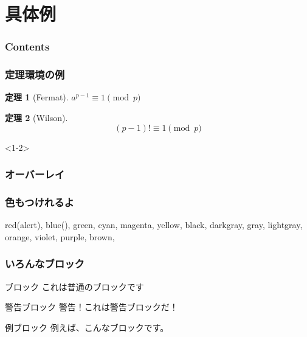 \documentclass[dvipdfmx,11pt,notheorems]{beamer}
\theoremstyle{definition}
\newtheorem{theorem}{定理}
\begin{document}
\section{具体例}
  \begin{frame}\frametitle{Contents}
    \tableofcontents[currentsection] %
  \end{frame}

  \begin{frame}\frametitle{定理環境の例}
  \begin{theorem}[Fermat]
  $a^{p-1} \equiv 1 \pmod{p}$
  \end{theorem}
  \pause
  \begin{theorem}[Wilson]
  \begin{equation}
  (p-1)! \equiv 1 \pmod{p}
  \end{equation}
  \end{theorem}
  \end{frame}

\begin{frame}<1-2>\frametitle{オーバーレイ}
\end{frame}

\begin{frame}\frametitle{色もつけれるよ}
  {\color{red} red}(\alert{alert}),
  {\color{blue} blue}(),
  {\color{green} green},
  {\color{cyan} cyan},
  {\color{magenta} magenta},
  {\color{yellow} yellow},
  {\color{black} black},
  {\color{darkgray} darkgray},
  {\color{gray} gray},
  {\color{lightgray} lightgray},
  {\color{orange} orange},
  {\color{violet} violet},
  {\color{purple} purple},
  {\color{brown} brown},
\end{frame}

\begin{frame}\frametitle{いろんなブロック}
\begin{block}{ブロック}
これは普通のブロックです
\end{block}

\begin{alertblock}{警告ブロック}
警告！これは警告ブロックだ！
\end{alertblock}

\begin{exampleblock}{例ブロック}
例えば、こんなブロックです。
\end{exampleblock}
\end{frame}
\end{document}
